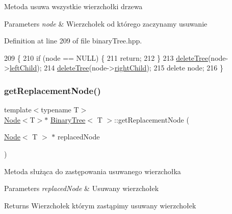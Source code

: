 Metoda usuwa wszystkie wierzchołki drzewa 
\begin{DoxyParams}{Parameters}
{\em node} & Wierzchołek od którego zaczynamy usuwanie \\
\hline
\end{DoxyParams}


Definition at line 209 of file binary\+Tree.\+hpp.


\begin{DoxyCode}
209                                        \{  
210             \textcolor{keywordflow}{if} (node == NULL) \{ 
211                 \textcolor{keywordflow}{return};  
212             \}
213             \hyperlink{classBinaryTree_a4653328dc7727b7c32285bb50a10f6c9}{deleteTree}(node->\hyperlink{classNode_a2eaaeffaeef97da6291b788fa131c9ec}{leftChild});  
214             \hyperlink{classBinaryTree_a4653328dc7727b7c32285bb50a10f6c9}{deleteTree}(node->\hyperlink{classNode_a625cff56d169157a568afaedbb11576b}{rightChild});  
215             \textcolor{keyword}{delete} node; 
216         \} 
\end{DoxyCode}
\mbox{\label{classBinaryTree_a0055a6962c39301b5def80189be99601}} 
\subsubsection{\texorpdfstring{get\+Replacement\+Node()}{getReplacementNode()}}
{\footnotesize\ttfamily template$<$typename T$>$ \\
\hyperlink{classNode}{Node}$<$T$>$$\ast$ \hyperlink{classBinaryTree}{Binary\+Tree}$<$ T $>$\+::get\+Replacement\+Node (\begin{DoxyParamCaption}\item[{\hyperlink{classNode}{Node}$<$ T $>$ $\ast$}]{replaced\+Node }\end{DoxyParamCaption})\hspace{0.3cm}{\ttfamily [inline]}}

Metoda służąca do zastępowania usuwanego wierzchołka 
\begin{DoxyParams}{Parameters}
{\em replaced\+Node} & Usuwany wierzchołek \\
\hline
\end{DoxyParams}
\begin{DoxyReturn}{Returns}
Wierzchołek którym zastąpimy usuwany wierzchołek 
\end{DoxyReturn}


